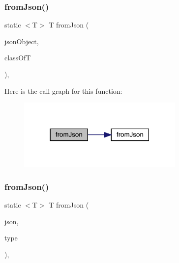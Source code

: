 \subsubsection{\texorpdfstring{from\+Json()}{fromJson()}\hspace{0.1cm}{\footnotesize\ttfamily [2/3]}}
{\footnotesize\ttfamily static $<$T$>$ T from\+Json (\begin{DoxyParamCaption}\item[{@Non\+Null J\+S\+O\+N\+Object}]{json\+Object,  }\item[{Class$<$ T $>$}]{class\+OfT }\end{DoxyParamCaption})\hspace{0.3cm}{\ttfamily [static]}, {\ttfamily [inherited]}}

Here is the call graph for this function\+:\nopagebreak
\begin{figure}[H]
\begin{center}
\leavevmode
\includegraphics[width=230pt]{classcom_1_1toast_1_1android_1_1gamebase_1_1base_1_1_value_object_ab83c4196ee2e3f11553bbe0f04dc2101_cgraph}
\end{center}
\end{figure}
\mbox{\label{classcom_1_1toast_1_1android_1_1gamebase_1_1base_1_1_value_object_aa901d97d495150b54bcb80c05672f58a}} 
\subsubsection{\texorpdfstring{from\+Json()}{fromJson()}\hspace{0.1cm}{\footnotesize\ttfamily [3/3]}}
{\footnotesize\ttfamily static $<$T$>$ T from\+Json (\begin{DoxyParamCaption}\item[{@Non\+Null String}]{json,  }\item[{Type}]{type }\end{DoxyParamCaption})\hspace{0.3cm}{\ttfamily [static]}, {\ttfamily [inherited]}}

